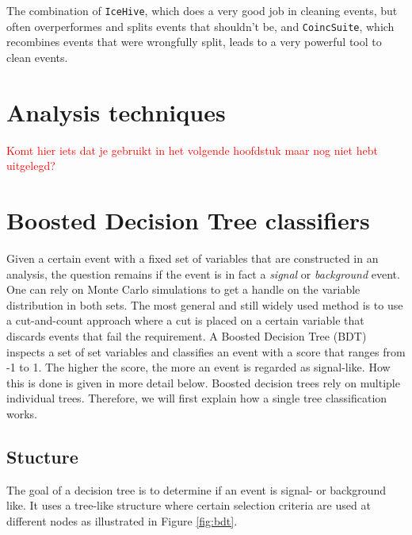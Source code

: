 \vspace{2mm}
\noindent The combination of \texttt{IceHive}, which does a very good job in cleaning events, but often overperformes and splits events that shouldn't be, and \texttt{CoincSuite}, which recombines events that were wrongfully split, leads to a very powerful tool to clean events.

\section{Analysis techniques}
\textcolor{red}{Komt hier iets dat je gebruikt in het volgende hoofdstuk maar nog niet hebt uitgelegd?}
\section{Boosted Decision Tree classifiers}
\label{sec:BDT}
Given a certain event with a fixed set of variables that are constructed in an analysis, the question remains if the event is in fact a \textit{signal} or \textit{background} event. One can rely on Monte Carlo simulations to get a handle on the variable distribution in both sets. The most general and still widely used method is to use a cut-and-count approach where a cut is placed on a certain variable that discards events that fail the requirement. A Boosted Decision Tree (BDT) inspects a set of set variables and classifies an event with a score that ranges from -1 to 1. The higher the score, the more an event is regarded as signal-like. How this is done is given in more detail below. Boosted decision trees rely on multiple individual trees. Therefore, we will first explain how a single tree classification works.


\subsection{Stucture}
The goal of a decision tree is to determine if an event is signal- or background like. It uses a tree-like structure where certain selection criteria are used at different nodes as illustrated in Figure \ref{fig:bdt}.

